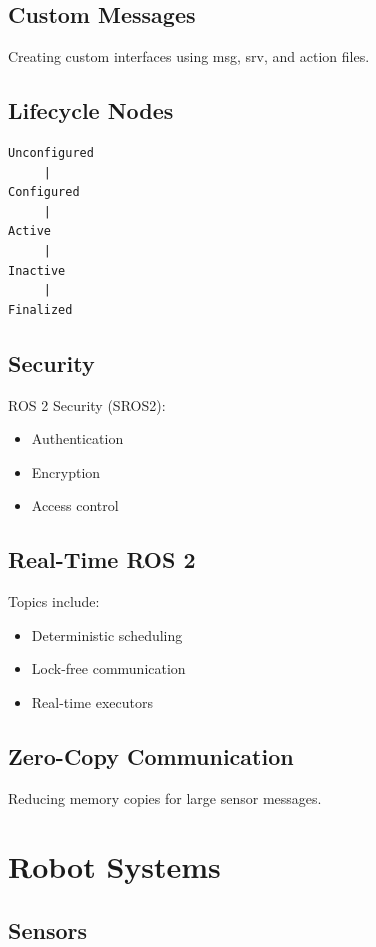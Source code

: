 \documentclass[11pt,oneside]{book}
\begin{document}
\chapter{Custom Messages}

Creating custom interfaces using msg, srv, and action files.

\chapter{Lifecycle Nodes}

\begin{verbatim}
Unconfigured
     |
Configured
     |
Active
     |
Inactive
     |
Finalized
\end{verbatim}

\chapter{Security}

ROS 2 Security (SROS2):

\begin{itemize}
\item Authentication
\item Encryption
\item Access control
\end{itemize}

\chapter{Real-Time ROS 2}

Topics include:

\begin{itemize}
\item Deterministic scheduling
\item Lock-free communication
\item Real-time executors
\end{itemize}

\chapter{Zero-Copy Communication}

Reducing memory copies for large sensor messages.

\part{Robot Systems}

\chapter{Sensors}
\end{document}
